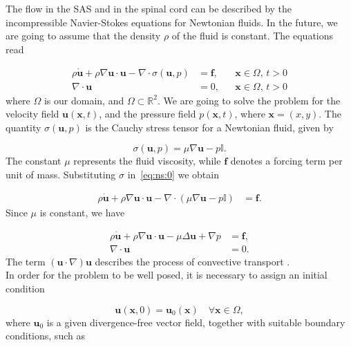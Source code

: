 \documentclass[a4paper,11pt,oneside]{book}
\begin{document}

The flow in the SAS and in the spinal cord can be described by the incompressible Navier-Stokes equations for Newtonian fluids. In the future, we are going to assume that the density $\rho$ of the fluid is constant. The equations read

\begin{align}
\label{eq:ns:0}
\rho \dot{\mathbf{u}}
+ \rho \nabla \mathbf{u} \cdot \mathbf{u}
- \nabla \cdot \sigma(\mathbf{u},p)
&= \mathbf{f},  && \mathbf{x} \in \Omega, \, t>0 \\
\nabla \cdot \mathbf{u} &= 0, && \mathbf{x} \in \Omega, \, t>0
\end{align}
where $\Omega$ is our domain, and $\Omega \subset \mathbb{R}^2$.  We are going to solve the problem for the velocity field $\mathbf{u}(\mathbf{x},t)$, and the pressure field $p(\mathbf{x},t)$, where $\mathbf{x} = (x,y)$. The quantity $\sigma(\mathbf{u}, p)$ is the Cauchy stress tensor for a Newtonian fluid, given by

\begin{equation}
\sigma(\mathbf{u}, p) = \mu \nabla \mathbf{u} - p \mathbb{I}.
\end{equation}
The constant $\mu$ represents the fluid viscosity, while $\mathbf{f}$ denotes a forcing term per unit of mass. Substituting $\sigma$ in~\eqref{eq:ns:0} we obtain

\begin{align}
\rho \dot{\mathbf{u}} + \rho \nabla \mathbf{u} \cdot \mathbf{u} - \nabla \cdot (\mu \nabla \mathbf{u} - p \mathbb{I}) &= \mathbf{f}.
\end{align}
Since $\mu$ is constant, we have

\begin{align}
\label{eq:ns:3}
\rho \dot{\mathbf{u}} + \rho \nabla \mathbf{u} \cdot \mathbf{u} - \mu \Delta \mathbf{u} +  \nabla p &= \mathbf{f}, \\
\label{eq:ns:3bis}
\nabla \cdot \mathbf{u} &= 0.
\end{align}
The term $(\mathbf{u} \cdot \nabla)\mathbf{u}$ describes the process of convective transport \cite{quarteroni1}.\\
In order for the problem to be well posed, it is necessary to assign an initial condition

\begin{equation}
\mathbf{u} (\mathbf{x}, 0) = \mathbf{u}_0(\mathbf{x}) \quad \forall \mathbf{x} \in \Omega,
\end{equation}
where $\mathbf{u}_0$ is a given divergence-free vector field, together with suitable boundary conditions, such as
\end{document}
